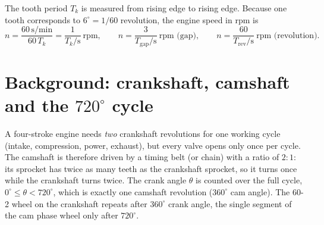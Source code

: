 The tooth period $T_k$ is measured from rising edge to rising edge. Because one
tooth corresponds to $6^\circ = 1/60$ revolution, the engine speed in rpm is
\begin{equation}
  n = \frac{60\,\text{s/min}}{60\,T_k} = \frac{1}{T_k/\text{s}}\ \text{rpm},
  \qquad
  n = \frac{3}{T_{\text{gap}}/\text{s}}\ \text{rpm (gap)},
  \qquad
  n = \frac{60}{T_{\text{rev}}/\text{s}}\ \text{rpm (revolution)}.
  \label{eq:rpm}
\end{equation}


\section*{Background: crankshaft, camshaft and the $720^\circ$ cycle}

A four-stroke engine needs \emph{two} crankshaft revolutions for one working
cycle (intake, compression, power, exhaust), but every valve opens only
once per cycle. The camshaft is therefore driven by a timing belt (or chain)
with a ratio of $2:1$: its sprocket has twice as many teeth as the crankshaft
sprocket, so it turns once while the crankshaft turns twice. The crank angle
$\theta$ is counted over the full cycle, $0^\circ\le\theta<720^\circ$, which
is exactly one camshaft revolution ($360^\circ$ cam angle). The 60-2 wheel on
the crankshaft repeats after $360^\circ$ crank angle, the single segment of
the cam phase wheel only after $720^\circ$.


